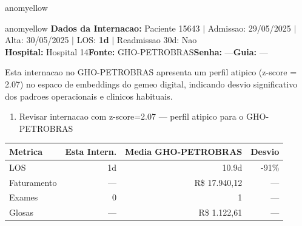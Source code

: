 \documentclass[a4paper,10pt]{article}
\begin{document}
\begin{anomalycard}[Internacao 166871 | GHO-PETROBRAS | MODERADO (z=2.08)]{anomyellow}

\end{anomalycard}

\newpage

\begin{anomalycard}[Internacao 133861 | GHO-PETROBRAS | MODERADO (z=2.07)]{anomyellow}
\textbf{Dados da Internacao:} Paciente 15643 $\mid$ Admissao: 29/05/2025 $\mid$ Alta: 30/05/2025 $\mid$ LOS: \textbf{1d} $\mid$ Readmissao 30d: Nao\\
\textbf{Hospital:} Hospital 14\quad\textbf{Fonte:} GHO-PETROBRAS\quad\textbf{Senha:} ---\quad\textbf{Guia:} ---\\
\vspace{2pt}\begin{tcolorbox}[colback=severityred!20,colframe=anomyellow,title={\textbf{Interpretacao de Negocio}},fonttitle=\bfseries\small,left=4pt,right=4pt,top=3pt,bottom=3pt]
{\small Esta internacao no GHO-PETROBRAS apresenta um perfil atipico (z-score = 2.07) no espaco de embeddings do gemeo digital, indicando desvio significativo dos padroes operacionais e clinicos habituais.}
\end{tcolorbox}
\begin{tcolorbox}[colback=severityyellow!30,colframe=anomorange,title={\textbf{Recomendacoes Especificas}},fonttitle=\bfseries\small,left=4pt,right=4pt,top=3pt,bottom=3pt]
\begin{enumerate}[nosep,leftmargin=16pt]
\item {\small Revisar internacao com z-score=2.07 --- perfil atipico para o GHO-PETROBRAS}
\end{enumerate}
\end{tcolorbox}
\begin{center}\begin{tabular}{l r r r}\toprule\textbf{Metrica} & \textbf{Esta Intern.} & \textbf{Media GHO-PETROBRAS} & \textbf{Desvio} \\\midrule
LOS & 1d & 10.9d & -91\% \\
Faturamento & --- & R\$ 17.940,12 & --- \\
Exames & 0 & 1 & --- \\
Glosas & --- & R\$ 1.122,61 & --- \\
\bottomrule\end{tabular}\end{center}


\end{anomalycard}
\end{document}
